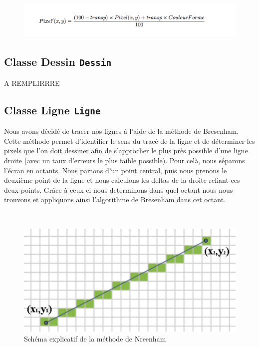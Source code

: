 \documentclass[11pt]{article}
\begin{document}
\begin{figure}[!htbp]
    \begin{center}
        \includegraphics[width=12cm]{Formule.png}
    \centering
    \end{center}
\end{figure}


\subsection{Classe Dessin \texttt{Dessin}}

A REMPLIRRRE

\clearpage

\subsection{Classe Ligne \texttt{Ligne}}

Nous avons décidé de tracer nos lignes à l'aide de la méthode de Bresenham. Cette méthode permet d’identifier le sens du tracé de la ligne et de déterminer les pixels que l'on doit dessiner afin de s'approcher le plus près possible d'une ligne droite (avec un taux d'erreurs le plus faible possible). Pour celà, nous séparons l'écran en octants. Nous partons d'un point central, puis nous prenons le deuxième point de la ligne et nous calculons les deltas de la droite reliant ces deux points. Grâce à ceux-ci nous determinons dans quel octant nous nous trouvons et appliquons ainsi l'algorithme de Bresenham dans cet octant. 

\
\

\begin{figure}[!htbp]
    \begin{center}
        \includegraphics[width=13cm]{Photo3.png}
        \caption{Schéma explicatif de la méthode de Nreenham}
    \centering
    \end{center}
\end{figure}
\end{document}
